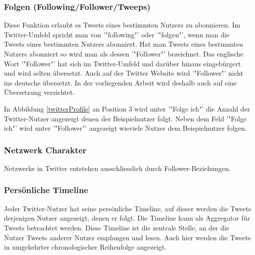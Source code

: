 		\subsubsection{Folgen (Following/Follower/Tweeps)}
			Diese Funktion erlaubt es Tweets eines bestimmten Nutzers zu abonnieren. 
			Im Twitter-Umfeld spricht man von '"following"' oder '"folgen"', wenn man die Tweets eines bestimmten Nutzers abonniert.
			Hat man Tweets eines bestimmten Nutzers abonniert so wird man als dessen '"Follower"' bezeichnet. 
			Das englische Wort '"Follower"' hat sich im Twitter-Umfeld und darüber hinaus eingebürgert und wird selten übersetzt. 
			Auch auf der Twitter Website wird '"Follower"' nicht ins deutsche übersetzt.
			In der vorliegenden Arbeit wird deshalb auch auf eine Übersetzung verzichtet. 

			In Abbildung \ref{twitterProfile} an Position 3 wird unter '"Folge ich"' die Anzahl der Twitter-Nutzer angezeigt denen der Beispielnutzer folgt. 
			Neben dem Feld '"Folge ich"' wird unter '"Follower"' angezeigt wieviele Nutzer dem Beispielnutzer folgen.


		\subsubsection{Netzwerk Charakter}
			Netzwerke in Twitter entstehen ausschliesslich durch Follower-Beziehungen.

			 


		\subsubsection{Persönliche Timeline}
			Jeder Twitter-Nutzer hat seine persönliche Timeline, auf dieser werden die Tweets derjenigen Nutzer angezeigt, denen er folgt. 
			Die Timeline kann als Aggregator für Tweets betrachtet werden.
			Diese Timeline ist die zentrale Stelle, an der die Nutzer Tweets anderer Nutzer empfangen und lesen.
			Auch hier werden die Tweets in umgekehrter chronologischer Reihenfolge angezeigt.  

